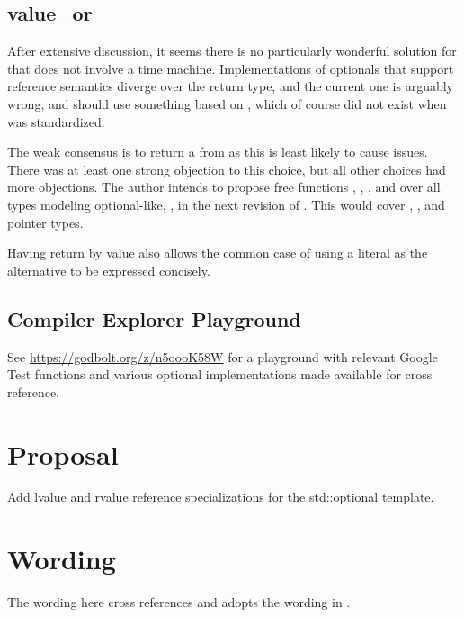 \documentclass[a4paper,10pt,oneside,openany,final,article]{memoir}
\begin{document}
\section{value_or}

After extensive discussion, it seems there is no particularly wonderful solution for  that does not involve a time machine. Implementations of optionals that support reference semantics diverge over the return type, and the current one is arguably wrong, and should use something based on , which of course did not exist when  was standardized.

The weak consensus is to return a  from  as this is least likely to cause issues. There was at least one strong objection to this choice, but all other choices had more objections. The author intends to propose free functions , , , and  over all types modeling optional-like, , in the next revision of \cite{P1255R12}. This would cover , , and pointer types.

Having  return by value also allows the common case of using a literal as the alternative to be expressed concisely.

\section{Compiler Explorer Playground}

See \url{https://godbolt.org/z/n5oooK58W} for a playground with relevant Google Test functions and various optional implementations made available for cross reference.

\chapter{Proposal}

Add lvalue and rvalue reference specializations for the std::optional template.

\chapter{Wording}

The wording here cross references and adopts the wording in \cite{P3091R2}.
\end{document}

